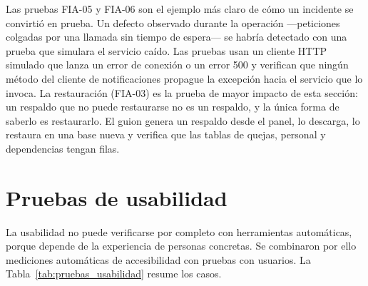 	Las pruebas FIA-05 y FIA-06 son el ejemplo más claro de cómo un incidente se convirtió en prueba. Un defecto observado durante la operación ---peticiones colgadas por una llamada sin tiempo
	de espera--- se habría detectado con una prueba que simulara el servicio caído. Las pruebas usan un
	cliente HTTP simulado que lanza un error de conexión o un error 500 y verifican que ningún método del
	cliente de notificaciones propague la excepción hacia el servicio que lo invoca. La restauración
	(FIA-03) es la prueba de mayor impacto de esta sección: un respaldo que no puede restaurarse no es un
	respaldo, y la única forma de saberlo es restaurarlo. El guion genera un respaldo desde el panel,
	lo descarga, lo restaura en una base nueva y verifica que las tablas de quejas, personal y
	dependencias tengan filas.

	\section{Pruebas de usabilidad}
	\label{sec:pruebas_usabilidad}
	La usabilidad no puede verificarse por completo con herramientas automáticas, porque depende de la
	experiencia de personas concretas. Se combinaron por ello mediciones automáticas de accesibilidad con
	pruebas con usuarios. La Tabla~\ref{tab:pruebas_usabilidad} resume los casos.

